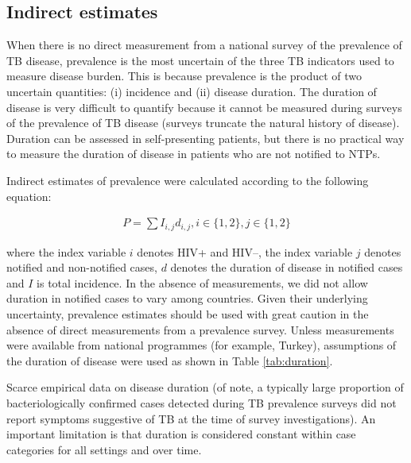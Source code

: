 \subsection{Indirect estimates}
When there is no direct measurement from a national survey of the prevalence of TB disease, prevalence is the most uncertain of the three TB indicators used to measure disease burden. This is because prevalence is the product of two uncertain quantities: (i) incidence and (ii) disease duration. The duration of disease is very difficult to quantify because it cannot be measured during surveys of the prevalence of TB disease (surveys truncate the natural history of disease). Duration can be assessed in self-presenting patients, but there is no practical way to measure the duration of disease in patients who are not notified to NTPs.

Indirect estimates of prevalence were calculated according to the following equation:

\begin{align*}
P = \sum I_{i,j} d_{i,j}, i \in \lbrace 1, 2\rbrace, j \in \lbrace 1, 2\rbrace
\end{align*}

where the index variable $i$ denotes HIV+ and HIV–, the index variable $j$ denotes notified and non-notified cases, $d$ denotes the duration of disease in notified cases and $I$ is total incidence. In the absence of measurements, we did not allow duration in notified cases to vary among countries. Given their underlying uncertainty, prevalence estimates should be used with great caution in the absence of direct measurements from a prevalence survey. Unless measurements were available from national programmes (for example, Turkey), assumptions of the duration of disease were used as shown in Table \ref{tab:duration}.

Scarce empirical data on disease duration (of note, a typically large proportion of bacteriologically confirmed cases detected during TB prevalence surveys did not report symptoms suggestive of TB at the time of survey investigations). An important limitation is that duration is considered constant within case categories for all settings and over time.